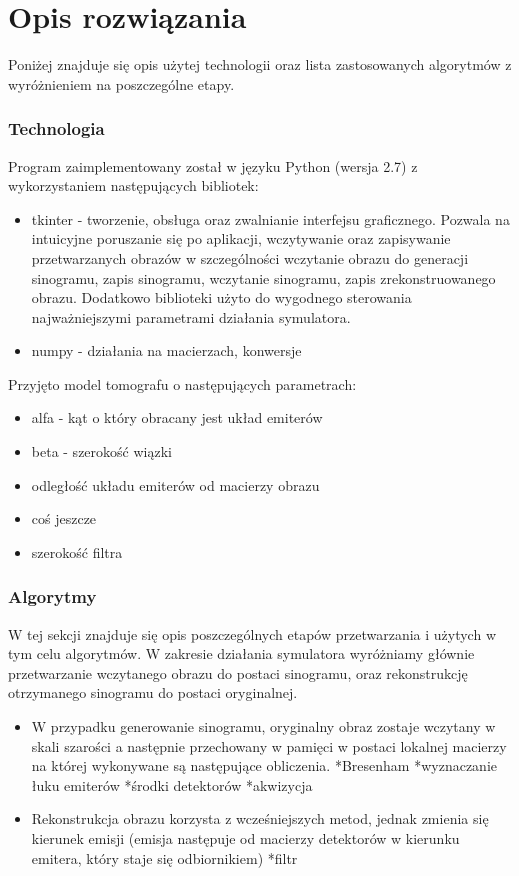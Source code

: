 \documentclass[A_4paper,12pt]{article}
\begin{document}
\section{Opis rozwiązania}
Poniżej znajduje się opis użytej technologii oraz lista zastosowanych algorytmów z wyróżnieniem na poszczególne etapy.
\subsubsection{Technologia}
Program zaimplementowany został w języku Python (wersja 2.7) z wykorzystaniem następujących bibliotek:
\begin{itemize}
\item tkinter - tworzenie, obsługa oraz zwalnianie interfejsu graficznego. 
	Pozwala na intuicyjne poruszanie się po aplikacji, wczytywanie oraz zapisywanie przetwarzanych obrazów w szczególności wczytanie obrazu do generacji sinogramu, zapis sinogramu, wczytanie sinogramu, zapis zrekonstruowanego obrazu. Dodatkowo biblioteki użyto do wygodnego sterowania najważniejszymi parametrami działania symulatora.
\item numpy - działania na macierzach, konwersje
\end{itemize}
\newpage
Przyjęto model tomografu o następujących parametrach:
\begin{itemize}
\item alfa - kąt o który obracany jest układ emiterów
\item beta - szerokość wiązki
\item odległość układu emiterów od macierzy obrazu
\item coś jeszcze
\item szerokość filtra
\end{itemize}

\subsubsection{Algorytmy}
W tej sekcji znajduje się opis poszczególnych etapów przetwarzania i użytych w tym celu algorytmów.
W zakresie działania symulatora wyróżniamy głównie przetwarzanie wczytanego obrazu do postaci sinogramu, oraz rekonstrukcję otrzymanego sinogramu do postaci oryginalnej.
\begin{itemize}
\item W przypadku generowanie sinogramu, oryginalny obraz zostaje wczytany w skali szarości a następnie przechowany w pamięci w postaci lokalnej macierzy na której wykonywane są następujące obliczenia.
*Bresenham
*wyznaczanie łuku emiterów
*środki detektorów
*akwizycja


\item Rekonstrukcja obrazu korzysta z wcześniejszych metod, jednak zmienia się kierunek emisji (emisja następuje od macierzy detektorów w kierunku emitera, który staje się odbiornikiem)
*filtr
\end{itemize}
\end{document}
